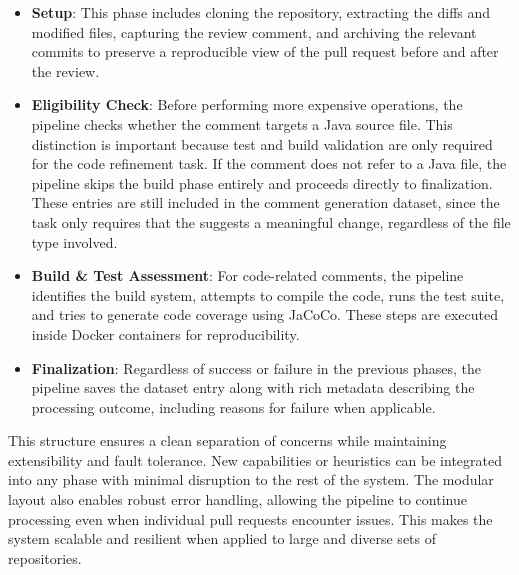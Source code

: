 \begin{itemize}
	\item \textbf{Setup}: This phase includes cloning the repository, extracting the diffs and
	      modified files, capturing the review comment, and archiving the relevant commits to preserve
	      a reproducible view of the pull request before and after the review.

	\item \textbf{Eligibility Check}: Before performing more expensive operations, the pipeline
	      checks whether the comment targets a Java source file. This distinction is important because
	      test and build validation are only required for the code refinement task. If the comment
	      does not refer to a Java file, the pipeline skips the build phase entirely and proceeds
	      directly to finalization. These entries are still included in the comment generation
	      dataset, since the task only requires that the \revComment suggests a meaningful change,
	      regardless of the file type involved.

	\item \textbf{Build \& Test Assessment}: For code-related comments, the pipeline identifies the build system,
	      attempts to compile the code, runs the test suite, and tries to generate code coverage using
	      JaCoCo. These steps are executed inside Docker containers for reproducibility.

	\item \textbf{Finalization}: Regardless of success or failure in the previous phases, the
	      pipeline saves the dataset entry along with rich metadata describing the processing outcome,
	      including reasons for failure when applicable.
\end{itemize}

This structure ensures a clean separation of concerns while maintaining extensibility and fault
tolerance. New capabilities or heuristics can be integrated into any phase with minimal disruption
to the rest of the system. The modular layout also enables robust error handling, allowing the
pipeline to continue processing even when individual pull requests encounter issues. This makes the
system scalable and resilient when applied to large and diverse sets of repositories.

